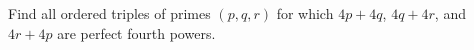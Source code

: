 Find all ordered triples of primes $(p,q,r)$ for which $4p+4q$, $4q+4r$, and $4r+4p$ are perfect fourth powers.
